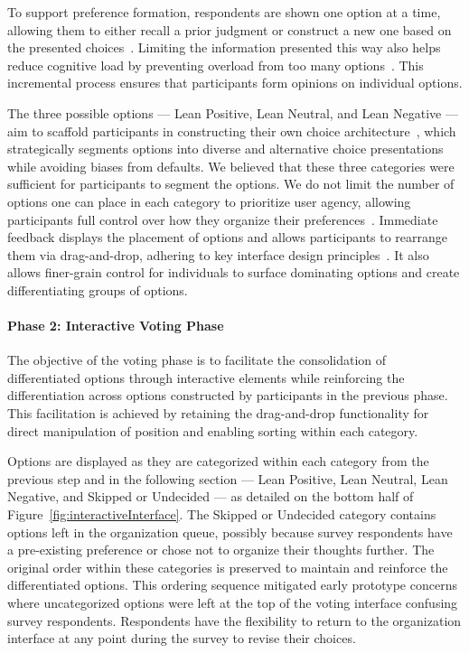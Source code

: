 To support preference formation, respondents are shown one option at a time, allowing them to either recall a prior judgment or construct a new one based on the presented choices~\cite{strackThinkingJudgingCommunicating1987}. Limiting the information presented this way also helps reduce cognitive load by preventing overload from too many options~\cite{swellerCognitiveLoadTheory2011}. This incremental process ensures that participants form opinions on individual options.

The three possible options --- Lean Positive, Lean Neutral, and Lean Negative --- aim to scaffold participants in constructing their own choice architecture~\cite{munscherReviewTaxonomyChoice2016, thalerNudgeImprovingDecisions2008a}, which strategically segments options into diverse and alternative choice presentations while avoiding biases from defaults. We believed that these three categories were sufficient for participants to segment the options. We do not limit the number of options one can place in each category to prioritize user agency, allowing participants full control over how they organize their preferences~\cite{norman2013design}. Immediate feedback displays the placement of options and allows participants to rearrange them via drag-and-drop, adhering to key interface design principles~\cite{norman2013design}. It also allows finer-grain control for individuals to surface dominating options and create differentiating groups of options.

\paragraph{Phase 2: Interactive Voting Phase}

The objective of the voting phase is to facilitate the consolidation of differentiated options through interactive elements while reinforcing the differentiation across options constructed by participants in the previous phase. This facilitation is achieved by retaining the drag-and-drop functionality for direct manipulation of position and enabling sorting within each category.

Options are displayed as they are categorized within each category from the previous step and in the following section --- Lean Positive, Lean Neutral, Lean Negative, and Skipped or Undecided --- as detailed on the bottom half of Figure~\ref{fig:interactiveInterface}. The Skipped or Undecided category contains options left in the organization queue, possibly because survey respondents have a pre-existing preference or chose not to organize their thoughts further. The original order within these categories is preserved to maintain and reinforce the differentiated options. This ordering sequence mitigated early prototype concerns where uncategorized options were left at the top of the voting interface confusing survey respondents. Respondents have the flexibility to return to the organization interface at any point during the survey to revise their choices.


